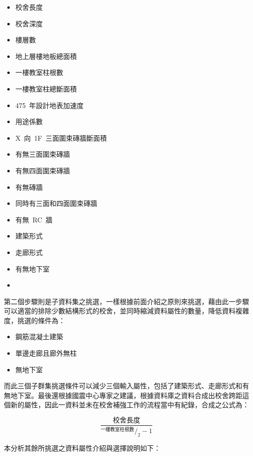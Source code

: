 \begin{multicols}{2}
\begin{itemize}
\item 校舍長度
\item 校舍深度
\item 樓層數
\item 地上層樓地板總面積
\item 一樓教室柱根數
\item 一樓教室柱總斷面積
\item 475~年設計地表加速度
\item 用途係數
\item X~向~1F~三面圍束磚牆斷面積
\item 有無三面圍束磚牆
\item 有無四面圍束磚牆
\item 有無磚牆
\item 同時有三面和四面圍束磚牆
\item 有無~RC~牆
\item 建築形式
\item 走廊形式
\item 有無地下室
\item[]
\end{itemize}
\end{multicols}

第二個步驟則是子資料集之挑選，一樣根據前面介紹之原則來挑選，藉由此一步驟可以適當的排除少數結構形式的校舍，並同時縮減資料屬性的數量，降低資料複雜度，挑選的條件為：

\begin{itemize}
\item 鋼筋混凝土建築
\item 單邊走廊且廊外無柱
\item 無地下室
\end{itemize}

而此三個子群集挑選條件可以減少三個輸入屬性，包括了建築形式、走廊形式和有無地下室。最後還根據國震中心專家之建議，根據資料庫之資料合成出校舍跨距這個新的屬性，因此一資料並未在校舍補強工作的流程當中有紀錄，合成之公式為：

\begin{equation} \dfrac{\text{校舍長度}}{^{\text{一樓教室柱根數}}/_2 - 1} \label{eq:span}\end{equation} 

本分析其餘所挑選之資料屬性介紹與選擇說明如下：

